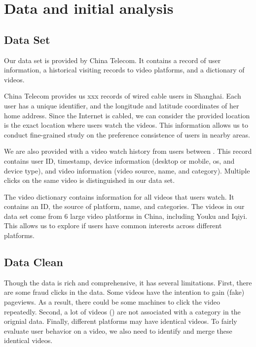 \section {Data and initial analysis}

\subsection{Data Set}
Our data set is provided by China Telecom. It contains a record of
user information, a historical visiting records to video platforms,
and a dictionary of videos. 

  China Telecom provides us xxx records of
wired cable users in Shanghai. Each user has a unique identifier, and
the longitude and latitude coordinates of her home address. Since the
Internet is cabled, we can consider the provided location is the exact
location where users watch the videos. This information allows us to
conduct fine-grained study on the preference consistence of users in
nearby areas.

 We are also provided with a video watch
history from  users between . This record
contains user ID, timestamp, device information (desktop or mobile,
os, and device type), and video
information (video source, name, and category). Multiple clicks on
the same video is distinguished in our data set. 

 The video dictionary contains information
for all videos that users watch. It contains an ID, the source of
platform, name, and categories. The videos in our data set come from 6
large video platforms in China, including Youku and Iqiyi. This allows
us to explore if users have common interests across different
platforms.



\subsection{Data Clean}

 Though the data is rich and comprehensive, it has
several limitations. First, there are some fraud clicks in the
data. Some videos have the intention to gain (fake) pageviews. As a
result, there could be some machines to click the video
repeatedly. Second, a lot of videos () are not
associated with a category in the orignial data. Finally, different
platforms may have identical videos. To fairly evaluate user behavior
on a video, we also need to identify and merge these identical videos.


